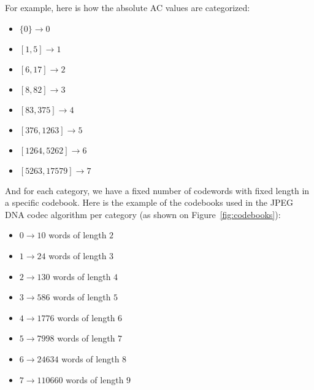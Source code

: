 For example, here is how the absolute AC values are categorized:

\begin{minipage}[t]{0.45\textwidth}
\begin{itemize}
    \item $\{0\} \rightarrow 0$
    \item $[1,5] \rightarrow 1$
    \item $[6,17] \rightarrow 2$
    \item $[8,82] \rightarrow 3$
\end{itemize}
\end{minipage}
\begin{minipage}[t]{0.45\textwidth}
\begin{itemize}
    \item $[83,375] \rightarrow 4$
    \item $[376,1263] \rightarrow 5$
    \item $[1264,5262] \rightarrow 6$
    \item $[5263,17579] \rightarrow 7$
\end{itemize}
\end{minipage}

And for each category, we have a fixed number of codewords with fixed length in a specific codebook. Here is the example of the codebooks used in the JPEG DNA codec algorithm per category (as shown on Figure~\ref{fig:codebooks}):

\newpage
\begin{minipage}[t]{0.45\textwidth}
\begin{itemize}
        \item $0 \rightarrow 10$ words of length $2$ 
        \item $1 \rightarrow 24$ words of length $3$
        \item $2 \rightarrow 130$ words of length $4$
        \item $3 \rightarrow 586$ words of length $5$
\end{itemize}
\end{minipage}
\begin{minipage}[t]{0.45\textwidth}
\begin{itemize}
        \item $4 \rightarrow 1776$ words of length $6$
        \item $5 \rightarrow 7998$ words of length $7$
        \item $6 \rightarrow 24634$ words of length $8$
        \item $7 \rightarrow 110660$ words of length $9$
\end{itemize}
\end{minipage}

